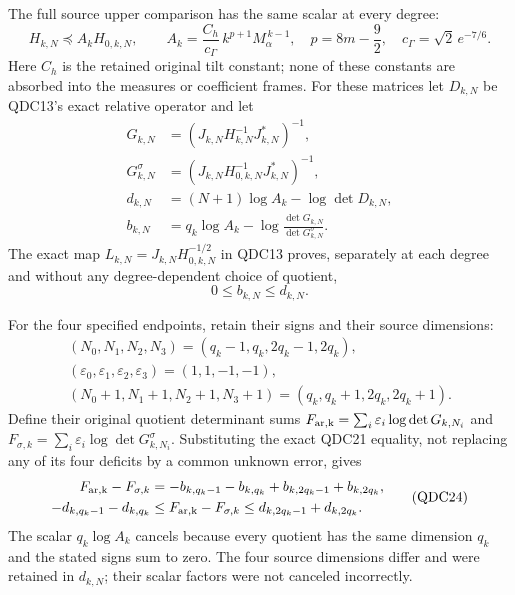 \documentclass[11pt,a4paper]{article}
\begin{document}
The full source upper comparison has the same scalar at every
degree:
\[
 H_{k,N}\preceq A_kH_{0,k,N},\qquad
 A_k=\frac{C_h}{c_\Gamma}\,k^{p+1}M_\alpha^{\,k-1},
 \quad p=8m-\frac92,\quad c_\Gamma=\sqrt2\,e^{-7/6}.
 \tag{QDC20}
\]
Here $C_h$ is the retained original tilt constant; none of these
constants are absorbed into the measures or coefficient frames.
For these matrices let $D_{k,N}$ be QDC13's exact relative
operator and let
\[
 \begin{split}
 G_{k,N}&=(J_{k,N}H_{k,N}^{-1}J_{k,N}^*)^{-1},\\
 G^\sigma_{k,N}
   &=(J_{k,N}H_{0,k,N}^{-1}J_{k,N}^*)^{-1},\\
 d_{k,N}&=(N+1)\log A_k-\log\det D_{k,N},\\
 b_{k,N}&=q_k\log A_k
                -\log\frac{\det G_{k,N}}{\det G^\sigma_{k,N}}.
 \end{split}
 \tag{QDC21}
\]
The exact map $L_{k,N}=J_{k,N}H_{0,k,N}^{-1/2}$ in
QDC13 proves, separately at each degree and without any
degree-dependent choice of quotient,
\[
 0\le b_{k,N}\le d_{k,N}.
 \tag{QDC22}
\]

For the four specified endpoints, retain their signs and
their source dimensions:
\[
 \begin{gathered}
 (N_0,N_1,N_2,N_3)=(q_k-1,q_k,2q_k-1,2q_k),\\
 (\varepsilon_0,\varepsilon_1,\varepsilon_2,\varepsilon_3)
      =(1,1,-1,-1),\\
 (N_0+1,N_1+1,N_2+1,N_3+1)
      =(q_k,q_k+1,2q_k,2q_k+1).
 \end{gathered}
 \tag{QDC23}
\]
Define their original quotient determinant sums
$F_{\rm ar,k}=\sum_i\varepsilon_i\log\det G_{k,N_i}$
and
$F_{\sigma,k}=\sum_i\varepsilon_i\log\det G^\sigma_{k,N_i}$.
Substituting the exact QDC21 equality, not replacing any
of its four deficits by a common unknown error, gives
\[
 \begin{split}
 F_{\rm ar,k}-F_{\sigma,k}
 &=-b_{k,q_k-1}-b_{k,q_k}
                  +b_{k,2q_k-1}+b_{k,2q_k},\\
 -d_{k,q_k-1}-d_{k,q_k}
 &\le F_{\rm ar,k}-F_{\sigma,k}
 \le d_{k,2q_k-1}+d_{k,2q_k}.
 \end{split}
 \tag{QDC24}
\]
The scalar $q_k\log A_k$ cancels because every quotient
has the same dimension $q_k$ and the stated signs sum to zero.
The four source dimensions differ and were retained in
$d_{k,N}$; their scalar factors were not canceled incorrectly.
\end{document}
